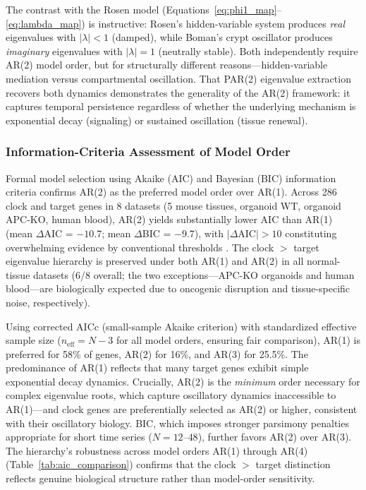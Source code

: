 \documentclass[11pt,letterpaper]{article}
\begin{document}
The contrast with the Rosen model (Equations~\ref{eq:phi1_map}--\ref{eq:lambda_map}) is instructive: Rosen's hidden-variable system produces \textit{real} eigenvalues with $|\lambda| < 1$ (damped), while Boman's crypt oscillator produces \textit{imaginary} eigenvalues with $|\lambda| = 1$ (neutrally stable). Both independently require AR(2) model order, but for structurally different reasons---hidden-variable mediation versus compartmental oscillation. That PAR(2) eigenvalue extraction recovers both dynamics demonstrates the generality of the AR(2) framework: it captures temporal persistence regardless of whether the underlying mechanism is exponential decay (signaling) or sustained oscillation (tissue renewal).

\subsubsection*{Information-Criteria Assessment of Model Order}

Formal model selection using Akaike (AIC) and Bayesian (BIC) information criteria confirms AR(2) as the preferred model order over AR(1). Across 286 clock and target genes in 8 datasets (5 mouse tissues, organoid WT, organoid APC-KO, human blood), AR(2) yields substantially lower AIC than AR(1) (mean $\Delta$AIC = $-10.7$; mean $\Delta$BIC = $-9.7$), with $|\Delta\text{AIC}| > 10$ constituting overwhelming evidence by conventional thresholds \citep{burnham2002}. The clock $>$ target eigenvalue hierarchy is preserved under both AR(1) and AR(2) in all normal-tissue datasets (6/8 overall; the two exceptions---APC-KO organoids and human blood---are biologically expected due to oncogenic disruption and tissue-specific noise, respectively).

Using corrected AICc (small-sample Akaike criterion) with standardized effective sample size ($n_{\text{eff}} = N - 3$ for all model orders, ensuring fair comparison), AR(1) is preferred for 58\% of genes, AR(2) for 16\%, and AR(3) for 25.5\%. The predominance of AR(1) reflects that many target genes exhibit simple exponential decay dynamics. Crucially, AR(2) is the \textit{minimum} order necessary for complex eigenvalue roots, which capture oscillatory dynamics inaccessible to AR(1)---and clock genes are preferentially selected as AR(2) or higher, consistent with their oscillatory biology. BIC, which imposes stronger parsimony penalties appropriate for short time series ($N = 12$--$48$), further favors AR(2) over AR(3). The hierarchy's robustness across model orders AR(1) through AR(4) (Table~\ref{tab:aic_comparison}) confirms that the clock $>$ target distinction reflects genuine biological structure rather than model-order sensitivity.
\end{document}
